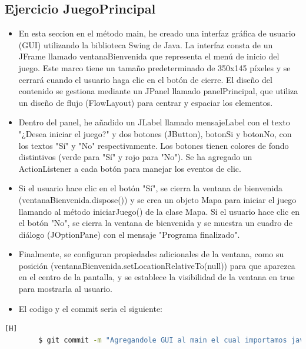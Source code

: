 \documentclass{article}
\begin{document}
	\subsection{Ejercicio JuegoPrincipal}
	\begin{itemize}	
		\item En esta seccion en el método main, he creado una interfaz gráfica de usuario (GUI) utilizando la biblioteca Swing de Java. La interfaz consta de un JFrame llamado ventanaBienvenida que representa el menú de inicio del juego. Este marco tiene un tamaño predeterminado de 350x145 píxeles y se cerrará cuando el usuario haga clic en el botón de cierre. El diseño del contenido se gestiona mediante un JPanel llamado panelPrincipal, que utiliza un diseño de flujo (FlowLayout) para centrar y espaciar los elementos.
		\item Dentro del panel, he añadido un JLabel llamado mensajeLabel con el texto "¿Desea iniciar el juego?" y dos botones (JButton), botonSi y botonNo, con los textos "Sí" y "No" respectivamente. Los botones tienen colores de fondo distintivos (verde para "Sí" y rojo para "No"). Se ha agregado un ActionListener a cada botón para manejar los eventos de clic.
		\item Si el usuario hace clic en el botón "Sí", se cierra la ventana de bienvenida (ventanaBienvenida.dispose()) y se crea un objeto Mapa para iniciar el juego llamando al método iniciarJuego() de la clase Mapa. Si el usuario hace clic en el botón "No", se cierra la ventana de bienvenida y se muestra un cuadro de diálogo (JOptionPane) con el mensaje "Programa finalizado".
		\item Finalmente, se configuran propiedades adicionales de la ventana, como su posición (ventanaBienvenida.setLocationRelativeTo(null)) para que aparezca en el centro de la pantalla, y se establece la visibilidad de la ventana en true para mostrarla al usuario. 
		\item El codigo y el commit seria el siguiente:
	\end{itemize}	
	\begin{lstlisting}[language=bash,caption={Commit}][H]
		$ git commit -m "Agregandole GUI al main el cual importamos java swing y java awt para el menu de inicio del juego y los diferentes metodos que aplicamos para su buena dispocion graficamente"
	\end{lstlisting}	
\end{document}
